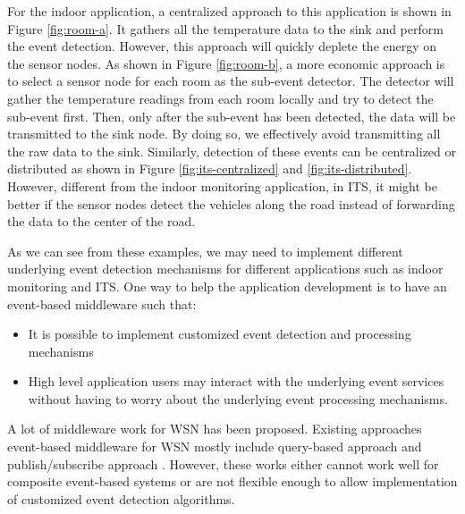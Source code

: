 For the indoor application, a centralized approach to this application is shown in Figure \ref{fig:room-a}. It gathers all the temperature data to the sink and perform the event detection. However, this approach will quickly deplete the energy on the sensor nodes. As shown in Figure \ref{fig:room-b}, a more economic approach is to select a sensor node for each room as the sub-event detector. The detector will gather the temperature readings from each room locally and try to detect the sub-event first. Then, only after the sub-event has been detected, the data will be transmitted to the sink node. By doing so, we effectively avoid transmitting all the raw data to the sink. Similarly, detection of these events can be centralized or distributed as shown in Figure \ref{fig:its-centralized} and \ref{fig:its-distributed}. However, different from the indoor monitoring application, in ITS, it might be better if the sensor nodes detect the vehicles along the road instead of forwarding the data to the center of the road. 

As we can see from these examples, we may need to implement different underlying event detection mechanisms for different applications such as indoor monitoring and ITS. One way to help the application development is to have an event-based middleware such that:
\begin{itemize}
\item It is possible to implement customized event detection and processing mechanisms
\item High level application users may interact with the underlying event services without having to worry about the underlying event processing mechanisms.
\end{itemize}

A lot of middleware work for WSN has been proposed. Existing approaches event-based middleware for WSN mostly include query-based approach \cite{tinydb} and publish/subscribe approach \cite{complexevent}. However, these works either cannot work well for composite event-based systems or are not flexible enough to allow implementation of customized event detection algorithms. 


 
